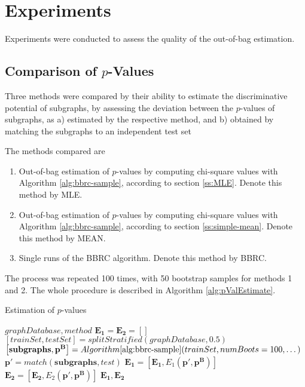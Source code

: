 \documentclass{article}
\begin{document}
\section{Experiments}
\label{s:Experiments}
Experiments were conducted to assess the quality of the out-of-bag estimation.

\subsection{Comparison of $p$-Values} Three methods were compared by their
ability to estimate the discriminative potential of subgraphs, by assessing the
deviation between the $p$-values of subgraphs, as a) estimated by the
respective method, and b) obtained by matching the subgraphs to an independent
test set

The methods compared are

\begin{enumerate}
  \item{Out-of-bag estimation of $p$-values by computing chi-square values with Algorithm \ref{alg:bbrc-sample}, according to section \ref{ss:MLE}. Denote this method by MLE.}
  \item{Out-of-bag estimation of $p$-values by computing chi-square values with Algorithm \ref{alg:bbrc-sample}, according to section \ref{ss:simple-mean}. Denote this method by MEAN.}
  \item{Single runs of the BBRC algorithm. Denote this method by BBRC.} 
\end{enumerate}

The process was repeated 100 times, with 50 bootstrap samples for methods 1 and 2. The whole procedure is described in Algorithm \ref{alg:pValEstimate}.
\begin{algorithm}
  \caption{Estimation of $p$-values}
  \label{alg:pValEstimate}
\begin{algorithmic}[1]
  \Require $graphDatabase, method$ 
  \State $\mathbf{E_1}=\mathbf{E_2}=\left[ \right]$
    \State $[trainSet, testSet] = splitStratified(graphDatabase,0.5)$ 
    \State $\left[ \mathbf{subgraphs}, \mathbf{p^B} \right] = Algorithm \ref{alg:bbrc-sample}(trainSet,numBoots=100,\dots)$ 
    \State $\mathbf{p'} = match(\mathbf{subgraphs}, test)$ 
    \State $ \mathbf{E_1} = \left[ \mathbf{E_1}, E_1(\mathbf{p'}, \mathbf{p^B}) \right]$
    \State $ \mathbf{E_2} = \left[ \mathbf{E_2}, E_2(\mathbf{p'}, \mathbf{p^B}) \right]$
  \EndFor
  \Ensure $\mathbf{E_1},\mathbf{E_2}$
\end{algorithmic}
\end{algorithm}
\end{document}
